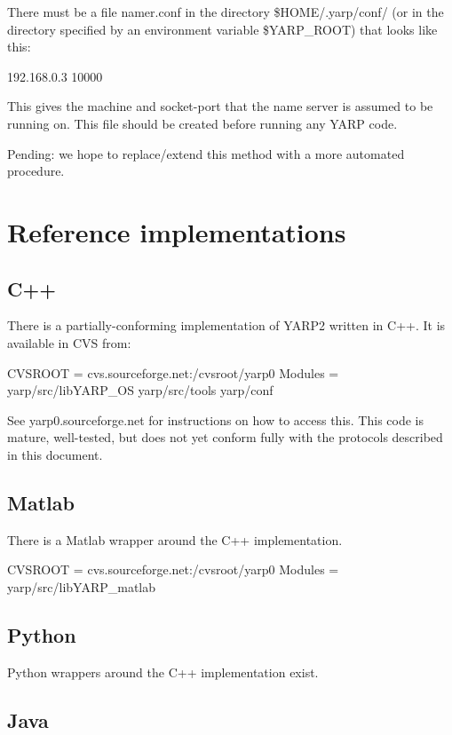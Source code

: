 \documentclass[a4]{article}
\begin{document}
There must be a file namer.conf in the directory \$HOME/.yarp/conf/
(or in the directory specified by an environment variable \$YARP\_ROOT)
that looks like this:
\begin{code}
192.168.0.3 10000
\end{code}
This gives the machine and socket-port that the name server is assumed
to be running on.  This file should be created before running any
YARP code.

Pending: we hope to replace/extend this method with a more 
automated procedure.


\section{Reference implementations}


\subsection{C++}

There is a partially-conforming implementation of YARP2 written
in C++.  It is available in CVS from:
\begin{code}
  CVSROOT = cvs.sourceforge.net:/cvsroot/yarp0
  Modules = yarp/src/libYARP_OS yarp/src/tools yarp/conf
\end{code}
See yarp0.sourceforge.net for instructions on how to access this.
This code is mature, well-tested, but does not yet conform fully
with the protocols described in this document.

\subsection{Matlab}

There is a Matlab wrapper around the C++ implementation.

\begin{code}
  CVSROOT = cvs.sourceforge.net:/cvsroot/yarp0
  Modules = yarp/src/libYARP_matlab
\end{code}

\subsection{Python}

Python wrappers around the C++ implementation exist.


\subsection{Java}
\end{document}
